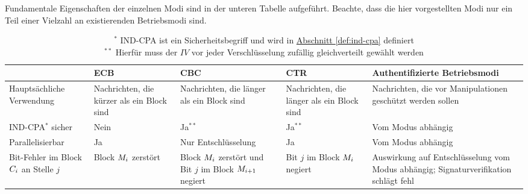 Fundamentale Eigenschaften der einzelnen Modi sind in der unteren Tabelle aufgeführt. Beachte, dass die hier vorgestellten Modi nur ein Teil einer Vielzahl an existierenden Betriebsmodi sind. \indexECB \indexCBC \indexCTR {}
\begin{table}[h]
	\captionsetup{labelformat=empty}
	\captionsetup{singlelinecheck=false}
	\captionsetup{font=footnotesize}
	\centering
	\begin{tabularx}{\textwidth}{ | >{\raggedright\arraybackslash}X | >{\raggedright\arraybackslash}X | >{\raggedright\arraybackslash}X | >{\raggedright\arraybackslash}X | >{\raggedright\arraybackslash}X |} 
		\hline
		& ECB & CBC & CTR & Authentifizierte Betriebsmodi\\ 
		\hline
		Hauptsächliche Verwendung & Nachrichten, die kürzer als ein Block sind & Nachrichten, die länger als ein Block sind
		& Nachrichten, die länger als ein Block sind & Nachrichten, die vor Manipulationen geschützt werden sollen\\ 
		\hline
		\parbox{3cm}{IND-CPA\(^{\ast}\) } sicher & Nein & Ja$^{\ast\ast}$ & Ja$^{\ast\ast}$ & Vom Modus abhängig\\
		\hline
		Parallelisierbar & Ja & Nur Entschlüsselung & Ja & Vom Modus abhängig\\ 
		\hline
		Bit-Fehler im Block $C_i$ an Stelle $j$ & Block $M_i$ zerstört & Block $M_i$ zerstört und Bit $j$ im Block $M_{i+1}$ negiert 
		& Bit $j$ im Block $M_i$ negiert & Auswirkung auf Entschlüsselung vom Modus abhängig; Signaturverifikation schlägt fehl\\
		\hline
	\end{tabularx}
	\caption{$^{\ast}$ IND-CPA ist ein Sicherheitsbegriff und wird in \hyperref[def:ind-cpa]{Abschnitt \ref{def:ind-cpa}} definiert\\ 
		$^{\ast\ast}$ Hierfür muss der $IV$ vor jeder Verschlüsselung zufällig gleichverteilt gewählt werden}
\end{table}
